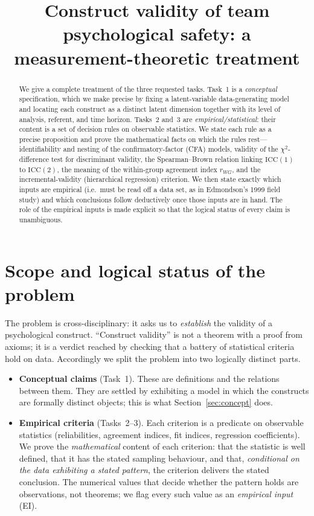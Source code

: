 \documentclass{amsart}
\theoremstyle{remark}
\begin{document}
\title{Construct validity of team psychological safety:
a measurement-theoretic treatment}
\maketitle

\begin{abstract}
We give a complete treatment of the three requested tasks. Task~1 is a
\emph{conceptual} specification, which we make precise by fixing a latent-variable
data-generating model and locating each construct as a distinct latent dimension
together with its level of analysis, referent, and time horizon. Tasks~2 and~3 are
\emph{empirical/statistical}: their content is a set of decision rules on observable
statistics. We state each rule as a precise proposition and prove the
mathematical facts on which the rules rest---identifiability and nesting of the
confirmatory-factor (CFA) models, validity of the $\chi^2$-difference test for
discriminant validity, the Spearman--Brown relation linking $\mathrm{ICC}(1)$ to
$\mathrm{ICC}(2)$, the meaning of the within-group agreement index $r_{WG}$, and the
incremental-validity (hierarchical regression) criterion. We then state exactly
which inputs are empirical (i.e.\ must be read off a data set, as in Edmondson's
1999 field study) and which conclusions follow deductively once those inputs are
in hand. The role of the empirical inputs is made explicit so that the logical
status of every claim is unambiguous.
\end{abstract}

\section{Scope and logical status of the problem}\label{sec:scope}

The problem is cross-disciplinary: it asks us to \emph{establish} the validity of a
psychological construct. ``Construct validity'' is not a theorem with a proof from
axioms; it is a verdict reached by checking that a battery of statistical criteria
hold on data. Accordingly we split the problem into two logically distinct parts.

\begin{itemize}
\item[(C)] \textbf{Conceptual claims} (Task~1). These are definitions and the
relations between them. They are settled by exhibiting a model in which the
constructs are formally distinct objects; this is what Section~\ref{sec:concept}
does.
\item[(E)] \textbf{Empirical criteria} (Tasks~2--3). Each criterion is a predicate
on observable statistics (reliabilities, agreement indices, fit indices,
regression coefficients). We prove the \emph{mathematical} content of each
criterion: that the statistic is well defined, that it has the stated sampling
behaviour, and that, \emph{conditional on the data exhibiting a stated pattern},
the criterion delivers the stated conclusion. The numerical values that decide
whether the pattern holds are observations, not theorems; we flag every such value
as an \emph{empirical input} (EI).
\end{itemize}
\end{document}
